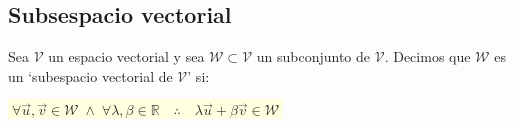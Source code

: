 \subsection{Subsespacio vectorial}
\vspace{0.5cm}

\begin{definition}

Sea $\mathcal V$ un espacio vectorial y sea $\mathcal W \subset \mathcal V$ un subconjunto de $\mathcal V$. Decimos que $\mathcal W$ es un `subespacio vectorial de $\mathcal V$' si:

\vspace{2mm}
\centerline{\colorbox{LightYellow}{$\boxed{\; \forall \vec u, \vec v \in \mathcal W \; \wedge \; \forall \lambda, \beta \in \mathbb R \quad \therefore \quad \lambda \vec u + \beta \vec v \in \mathcal W\; }$}}

\end{definition}

\justify

